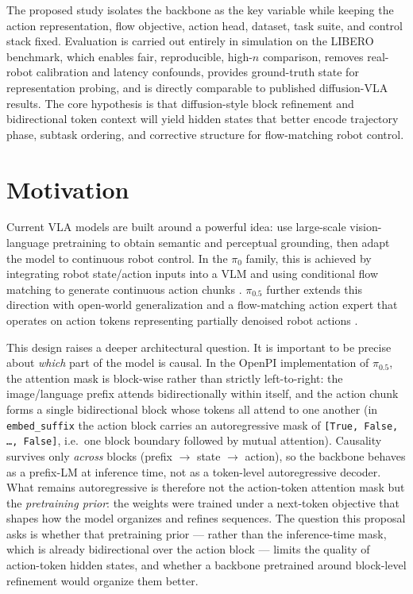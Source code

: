 \documentclass[11pt]{article}
\begin{document}
The proposed study isolates the backbone as the key variable while keeping the action representation, flow objective, action head, dataset, task suite, and control stack fixed. Evaluation is carried out entirely in simulation on the LIBERO benchmark, which enables fair, reproducible, high-$n$ comparison, removes real-robot calibration and latency confounds, provides ground-truth state for representation probing, and is directly comparable to published diffusion-VLA results. The core hypothesis is that diffusion-style block refinement and bidirectional token context will yield hidden states that better encode trajectory phase, subtask ordering, and corrective structure for flow-matching robot control.

\section{Motivation}

Current VLA models are built around a powerful idea: use large-scale vision-language pretraining to obtain semantic and perceptual grounding, then adapt the model to continuous robot control. In the $\pi_0$ family, this is achieved by integrating robot state/action inputs into a VLM and using conditional flow matching to generate continuous action chunks \cite{pi0}. $\pi_{0.5}$ further extends this direction with open-world generalization and a flow-matching action expert that operates on action tokens representing partially denoised robot actions \cite{pi05,openpi}. 

This design raises a deeper architectural question. It is important to be precise about \emph{which} part of the model is causal. In the OpenPI implementation of $\pi_{0.5}$, the attention mask is block-wise rather than strictly left-to-right: the image/language prefix attends bidirectionally within itself, and the action chunk forms a single bidirectional block whose tokens all attend to one another (in \texttt{embed\_suffix} the action block carries an autoregressive mask of \texttt{[True, False, \ldots, False]}, i.e.\ one block boundary followed by mutual attention). Causality survives only \emph{across} blocks (prefix $\rightarrow$ state $\rightarrow$ action), so the backbone behaves as a prefix-LM at inference time, not as a token-level autoregressive decoder. What remains autoregressive is therefore not the action-token attention mask but the \emph{pretraining prior}: the weights were trained under a next-token objective that shapes how the model organizes and refines sequences. The question this proposal asks is whether that pretraining prior --- rather than the inference-time mask, which is already bidirectional over the action block --- limits the quality of action-token hidden states, and whether a backbone pretrained around block-level refinement would organize them better.
\end{document}
